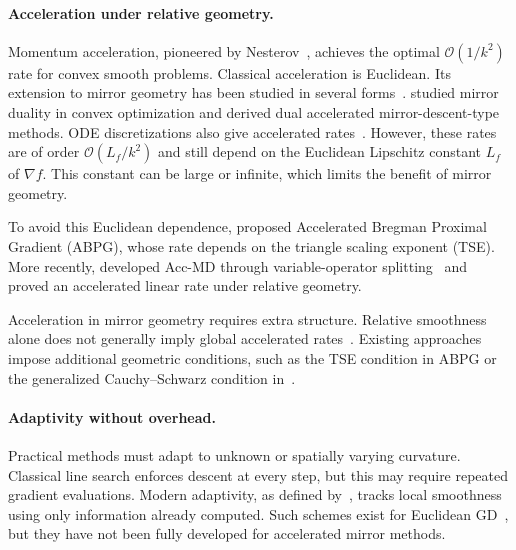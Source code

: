 \documentclass{article}
\theoremstyle{plain}
\theoremstyle{definition}
\theoremstyle{remark}
\begin{document}
\paragraph{Acceleration under relative geometry.}
Momentum acceleration, pioneered by Nesterov~\cite{nesterov1983method}, achieves the optimal $\mathcal O(1/k^2)$ rate for convex smooth problems. Classical acceleration is Euclidean. Its extension to mirror geometry has been studied in several forms~\cite{nemirovski2004prox,nesterov2005smooth}. \citet{kim2023mirror} studied mirror duality in convex optimization and derived dual accelerated mirror-descent-type methods. ODE discretizations also give accelerated rates~\cite{krichene2015accelerated,yuan2023analysis}. However, these rates are of order $\mathcal O(L_f/k^2)$ and still depend on the Euclidean Lipschitz constant $L_f$ of $\nabla f$. This constant can be large or infinite, which limits the benefit of mirror geometry.

To avoid this Euclidean dependence, \citet{Hanzely2021} proposed Accelerated Bregman Proximal Gradient (ABPG), whose rate depends on the triangle scaling exponent (TSE). More recently, \citet{chen2025accmd} developed Acc-MD through variable-operator splitting~\cite{chen2025accelerated} and proved an accelerated linear rate under relative geometry.

Acceleration in mirror geometry requires extra structure. Relative smoothness alone does not generally imply global accelerated rates~\cite{DragomTaylordAspreBolte2022Optimal}. Existing approaches impose additional geometric conditions, such as the TSE condition in ABPG or the generalized Cauchy--Schwarz condition in~\cite{chen2025accelerated}. 

\paragraph{Adaptivity without overhead.}
Practical methods must adapt to unknown or spatially varying curvature. Classical line search enforces descent at every step, but this may require repeated gradient evaluations. Modern adaptivity, as defined by~\cite{malitsky2024adaptive}, tracks local smoothness using only information already computed. Such schemes exist for Euclidean GD~\citep{malitsky2019adaptive,xu2026adaptiveacceleratedgradientdescent}, but they have not been fully developed for accelerated mirror methods.
\end{document}
